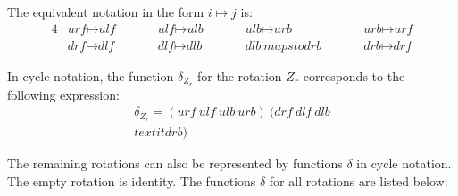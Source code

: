 \documentclass[12pt,a4paper]{article}
\theoremstyle{custom}
\begin{document}
The equivalent notation in the form $i \mapsto j$ is:
\begin{alignat*}{4}
& \textit{urf} \mapsto \textit{ulf} \ \ \ \ \ \ \ \ && \textit{ulf} \mapsto \textit{ulb} \ \ \ \ \ \ \ \ && \textit{ulb} \mapsto \textit{urb} \ \ \ \ \ \ \ \ && \textit{urb} \mapsto \textit{urf} \\
& \textit{drf} \mapsto \textit{dlf} \ \ \ \ \ \ \ \ && \textit{dlf} \mapsto \textit{dlb} \ \ \ \ \ \ \ \ && \textit{dlb} \ mapsto \textit{drb} \ \ \ \ \ \ \ \ && \textit{drb} \mapsto \textit{drf}
\end{alignat*}

In cycle notation, the function $\delta_{Z_r}$ for the rotation $Z_r$ corresponds to the following expression:
\begin{align*}
\delta _{Z_r}=( \textit{urf} \ \textit{ulf} \ \textit{ulb} \ \textit{urb} )\ ( \textit{drf} \ \textit{dlf} \ \textit{dlb} \\textit{drb} )
\end{align*}
 

The remaining rotations can also be represented by functions $\delta$ in cycle notation. The empty rotation is identity. The functions $\delta$ for all rotations are listed below:
\end{document}
